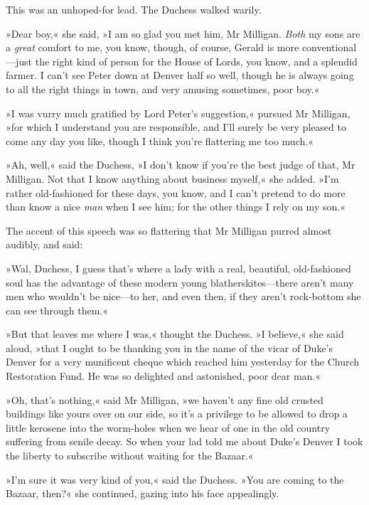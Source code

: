 This was an unhoped-for lead. The Duchess walked warily.

»Dear boy,« she said, »I am so glad you met him, Mr Milligan. \textit{Both} my sons are a \textit{great} comfort to me, you know, though, of course, Gerald is more conventional\allowbreak---\allowbreak just the right kind of person for the House of Lords, you know, and a splendid farmer. I can't see Peter down at Denver half so well, though he is always going to all the right things in town, and very amusing sometimes, poor boy.«

»I was vurry much gratified by Lord Peter's suggestion,« pursued Mr Milligan, »for which I understand you are responsible, and I'll surely be very pleased to come any day you like, though I think you're flattering me too much.«

»Ah, well,« said the Duchess, »I don't know if you're the best judge of that, Mr Milligan. Not that I know anything about business myself,« she added. »I'm rather old-fashioned for these days, you know, and I can't pretend to do more than know a nice \textit{man} when I see him; for the other things I rely on my son.«

The accent of this speech was so flattering that Mr Milligan purred almost audibly, and said:

»Wal, Duchess, I guess that's where a lady with a real, beautiful, old-fashioned soul has the advantage of these modern young blatherskites\allowbreak---\allowbreak there aren't many men who wouldn't be nice\allowbreak---\allowbreak to her, and even then, if they aren't rock-bottom she can see through them.«

»But that leaves me where I was,« thought the Duchess. »I believe,« she said aloud, »that I ought to be thanking you in the name of the vicar of Duke's Denver for a very munificent cheque which reached him yesterday for the Church Restoration Fund. He was so delighted and astonished, poor dear man.«

»Oh, that's nothing,« said Mr Milligan, »we haven't any fine old crusted buildings like yours over on our side, so it's a privilege to be allowed to drop a little kerosene into the worm-holes when we hear of one in the old country suffering from senile decay. So when your lad told me about Duke's Denver I took the liberty to subscribe without waiting for the Bazaar.«

»I'm sure it was very kind of you,« said the Duchess. »You are coming to the Bazaar, then?« she continued, gazing into his face appealingly.

